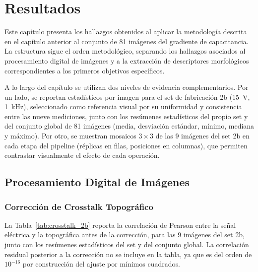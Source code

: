 \chapter{Resultados}

Este capítulo presenta los hallazgos obtenidos al aplicar la metodología descrita en el capítulo anterior al conjunto de 81 imágenes del gradiente de capacitancia. La estructura sigue el orden metodológico, separando los hallazgos asociados al procesamiento digital de imágenes y a la extracción de descriptores morfológicos correspondientes a los primeros objetivos específicos.

A lo largo del capítulo se utilizan dos niveles de evidencia complementarios. Por un lado, se reportan estadísticos por imagen para el set de fabricación 2b (15~V, 1~kHz), seleccionado como referencia visual por su uniformidad y consistencia entre las nueve mediciones, junto con los resúmenes estadísticos del propio set y del conjunto global de 81 imágenes (media, desviación estándar, mínimo, mediana y máximo). Por otro, se muestran mosaicos $3\times3$ de las 9 imágenes del set 2b en cada etapa del pipeline (réplicas en filas, posiciones en columnas), que permiten contrastar visualmente el efecto de cada operación.

\section{Procesamiento Digital de Imágenes}

\subsection{Corrección de Crosstalk Topográfico}

La Tabla~\ref{tab:crosstalk_2b} reporta la correlación de Pearson entre la señal eléctrica y la topográfica antes de la corrección, para las 9 imágenes del set 2b, junto con los resúmenes estadísticos del set y del conjunto global. La correlación residual posterior a la corrección no se incluye en la tabla, ya que es del orden de $10^{-16}$ por construcción del ajuste por mínimos cuadrados.

